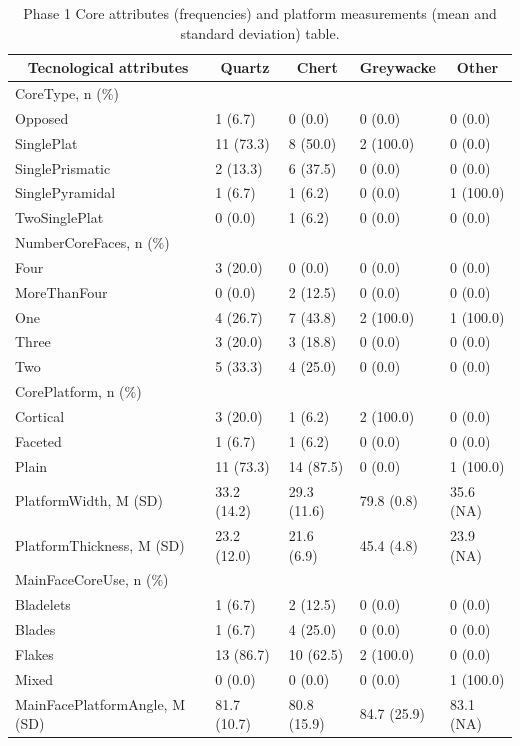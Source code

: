 \documentclass[12pt,twoside]{reedthesis}
\begin{document}
\begin{longtable}[t]{lllll}
\caption{\label{tab:unnamed-chunk-57}Phase 1 Core attributes (frequencies) and platform measurements (mean and standard deviation) table.}\\
\toprule
\multicolumn{1}{c}{\textbf{Tecnological attributes}} & \multicolumn{1}{c}{\textbf{Quartz}} & \multicolumn{1}{c}{\textbf{Chert}} & \multicolumn{1}{c}{\textbf{Greywacke}} & \multicolumn{1}{c}{\textbf{Other}}\\
\midrule
CoreType, n (\%) &  &  &  & \\
Opposed & 1 (6.7) & 0 (0.0) & 0 (0.0) & 0 (0.0)\\
SinglePlat & 11 (73.3) & 8 (50.0) & 2 (100.0) & 0 (0.0)\\
SinglePrismatic & 2 (13.3) & 6 (37.5) & 0 (0.0) & 0 (0.0)\\
SinglePyramidal & 1 (6.7) & 1 (6.2) & 0 (0.0) & 1 (100.0)\\
\addlinespace
TwoSinglePlat & 0 (0.0) & 1 (6.2) & 0 (0.0) & 0 (0.0)\\
NumberCoreFaces, n (\%) &  &  &  & \\
Four & 3 (20.0) & 0 (0.0) & 0 (0.0) & 0 (0.0)\\
MoreThanFour & 0 (0.0) & 2 (12.5) & 0 (0.0) & 0 (0.0)\\
One & 4 (26.7) & 7 (43.8) & 2 (100.0) & 1 (100.0)\\
\addlinespace
Three & 3 (20.0) & 3 (18.8) & 0 (0.0) & 0 (0.0)\\
Two & 5 (33.3) & 4 (25.0) & 0 (0.0) & 0 (0.0)\\
CorePlatform, n (\%) &  &  &  & \\
Cortical & 3 (20.0) & 1 (6.2) & 2 (100.0) & 0 (0.0)\\
Faceted & 1 (6.7) & 1 (6.2) & 0 (0.0) & 0 (0.0)\\
\addlinespace
Plain & 11 (73.3) & 14 (87.5) & 0 (0.0) & 1 (100.0)\\
PlatformWidth, M (SD) & 33.2 (14.2) & 29.3 (11.6) & 79.8 (0.8) & 35.6 (NA)\\
PlatformThickness, M (SD) & 23.2 (12.0) & 21.6 (6.9) & 45.4 (4.8) & 23.9 (NA)\\
MainFaceCoreUse, n (\%) &  &  &  & \\
Bladelets & 1 (6.7) & 2 (12.5) & 0 (0.0) & 0 (0.0)\\
\addlinespace
Blades & 1 (6.7) & 4 (25.0) & 0 (0.0) & 0 (0.0)\\
Flakes & 13 (86.7) & 10 (62.5) & 2 (100.0) & 0 (0.0)\\
Mixed & 0 (0.0) & 0 (0.0) & 0 (0.0) & 1 (100.0)\\
MainFacePlatformAngle, M (SD) & 81.7 (10.7) & 80.8 (15.9) & 84.7 (25.9) & 83.1 (NA)\\
\bottomrule
\end{longtable}
\end{document}
